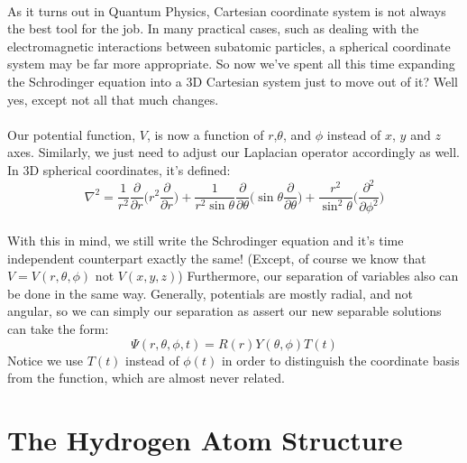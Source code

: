 \documentclass[12pt,letterpaper]{book}
\begin{document}
\paragraph*{}As it turns out in Quantum Physics, Cartesian coordinate system is not always the best tool for the job. In many practical cases, such as dealing with the electromagnetic interactions between subatomic particles, a spherical coordinate system may be far more appropriate. So now we've spent all this time expanding the Schrodinger equation into a 3D Cartesian system just to move out of it? Well yes, except not all that much changes.
\paragraph*{}Our potential function, $V$, is now a function of $r$,$\theta$, and $\phi$ instead of $x$, $y$ and $z$ axes. Similarly, we just need to adjust our Laplacian operator accordingly as well. In 3D spherical coordinates, it's defined:
\begin{equation}
\label{3D Polar Laplacian}
\nabla^2 = \frac{1}{r^2} \frac{\partial}{\partial r} 
\bigg( r^2 \frac{\partial}{\partial r} \bigg) + 
\frac{1}{r^2 \sin\theta}\frac{\partial}{\partial \theta}
\bigg( \sin\theta \frac{\partial}{\partial \theta} \bigg) + 
\frac{r^2}{\sin^2\theta} 
\bigg( \frac{\partial^2}{\partial\phi^2} \bigg)
\end{equation}
\paragraph*{}With this in mind, we still write the Schrodinger equation and it's time independent counterpart exactly the same! (Except, of course we know that $V = V(r,\theta, \phi)$ not $V(x,y,z)$) Furthermore, our separation of variables also can be done in the same way. Generally, potentials are mostly radial, and not angular, so we can simply our separation as assert our new separable solutions can take the form:
\begin{equation}
\Psi(r,\theta,\phi,t) = R(r) Y(\theta,\phi) T(t)
\end{equation}
Notice we use $T(t)$ instead of $\phi(t)$ in order to distinguish the coordinate basis from the function, which are almost never related.


\section{The Hydrogen Atom Structure}
\end{document}
